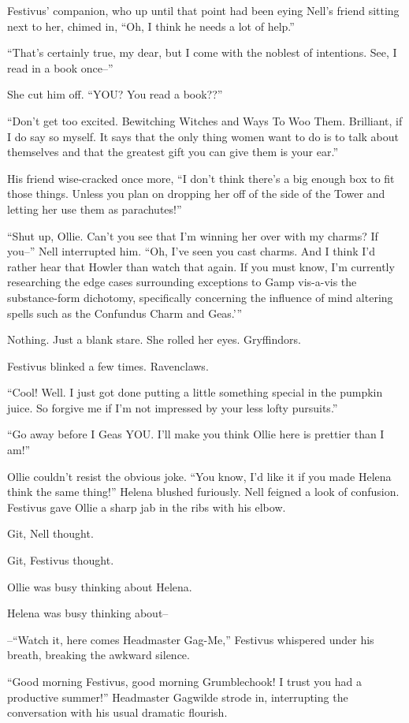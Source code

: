 Festivus’ companion, who up until that point had been eying Nell’s friend sitting next to her, chimed in, “Oh, I think he needs a lot of help.”

“That’s certainly true, my dear, but I come with the noblest of intentions. See, I read in a book once–”

She cut him off. “YOU? You read a book??”

“Don’t get too excited. Bewitching Witches and Ways To Woo Them. Brilliant, if I do say so myself. It says that the only thing women want to do is to talk about themselves and that the greatest gift you can give them is your ear.”

His friend wise-cracked once more, “I don’t think there’s a big enough box to fit those things. Unless you plan on dropping her off of the side of the Tower and letting her use them as parachutes!”

“Shut up, Ollie. Can’t you see that I’m winning her over with my charms? If you–” Nell interrupted him. “Oh, I’ve seen you cast charms. And I think I’d rather hear that Howler than watch that again. If you must know, I’m currently researching the edge cases surrounding exceptions to Gamp vis-a-vis the substance-form dichotomy, specifically concerning the influence of mind altering spells such as the Confundus Charm and Geas.'”

Nothing. Just a blank stare. She rolled her eyes. Gryffindors.

Festivus blinked a few times. Ravenclaws.

“Cool! Well. I just got done putting a little something special in the pumpkin juice. So forgive me if I’m not impressed by your less lofty pursuits.”

“Go away before I Geas YOU. I’ll make you think Ollie here is prettier than I am!”

Ollie couldn’t resist the obvious joke. “You know, I’d like it if you made Helena think the same thing!” Helena blushed furiously. Nell feigned a look of confusion. Festivus gave Ollie a sharp jab in the ribs with his elbow.

Git, Nell thought.

Git, Festivus thought.

Ollie was busy thinking about Helena.

Helena was busy thinking about–

–“Watch it, here comes Headmaster Gag-Me,” Festivus whispered under his breath, breaking the awkward silence.

“Good morning Festivus, good morning Grumblechook! I trust you had a productive summer!” Headmaster Gagwilde strode in, interrupting the conversation with his usual dramatic flourish.

